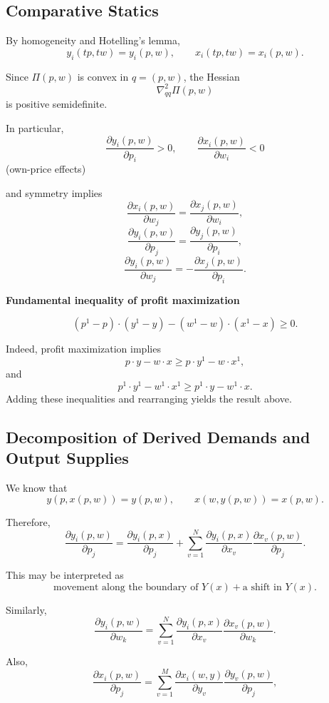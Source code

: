 \subsection*{Comparative Statics}

By homogeneity and Hotelling's lemma,
\[
y_i(tp,tw)=y_i(p,w),
\qquad
x_i(tp,tw)=x_i(p,w).
\]

Since $\Pi(p,w)$ is convex in $q=(p,w)$, the Hessian
\[
\nabla_{qq}^2 \Pi(p,w)
\]
is positive semidefinite.

\medskip

In particular,
\[
\frac{\partial y_i(p,w)}{\partial p_i} > 0,
\qquad
\frac{\partial x_i(p,w)}{\partial w_i} < 0
\]
\hfill (own-price effects)

and symmetry implies
\[
\frac{\partial x_i(p,w)}{\partial w_j}
=
\frac{\partial x_j(p,w)}{\partial w_i},
\]
\[
\frac{\partial y_i(p,w)}{\partial p_j}
=
\frac{\partial y_j(p,w)}{\partial p_i},
\]
\[
\frac{\partial y_i(p,w)}{\partial w_j}
=
-\frac{\partial x_j(p,w)}{\partial p_i}.
\]



\textbf{Fundamental inequality of profit maximization}

\[
(p^1-p)\cdot (y^1-y) - (w^1-w)\cdot (x^1-x) \ge 0.
\]

Indeed, profit maximization implies
\[
p\cdot y - w\cdot x \ge p\cdot y^1 - w\cdot x^1,
\]
and
\[
p^1 \cdot y^1 - w^1 \cdot x^1 \ge p^1 \cdot y - w^1 \cdot x.
\]
Adding these inequalities and rearranging yields the result above.

\subsection*{Decomposition of Derived Demands and Output Supplies}

We know that
\[
y(p,x(p,w)) = y(p,w),
\qquad
x(w,y(p,w)) = x(p,w).
\]

Therefore,
\[
\frac{\partial y_i(p,w)}{\partial p_j}
=
\frac{\partial y_i(p,x)}{\partial p_j}
+
\sum_{v=1}^N
\frac{\partial y_i(p,x)}{\partial x_v}
\frac{\partial x_v(p,w)}{\partial p_j}.
\]

This may be interpreted as
\[
\text{movement along the boundary of } Y(x)
+
\text{a shift in } Y(x).
\]

Similarly,
\[
\frac{\partial y_i(p,w)}{\partial w_k}
=
\sum_{v=1}^N
\frac{\partial y_i(p,x)}{\partial x_v}
\frac{\partial x_v(p,w)}{\partial w_k}.
\]

Also,
\[
\frac{\partial x_i(p,w)}{\partial p_j}
=
\sum_{v=1}^M
\frac{\partial x_i(w,y)}{\partial y_v}
\frac{\partial y_v(p,w)}{\partial p_j},
\]

